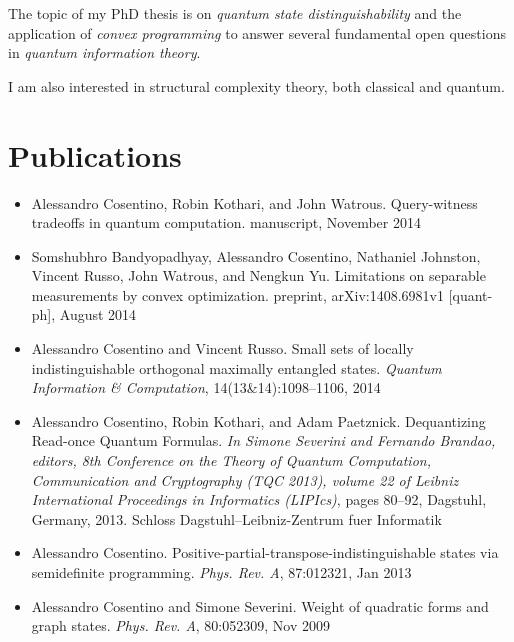 \documentclass[]{article}
\begin{document}
The topic of my PhD thesis is on \emph{quantum state distinguishability} 
and the application of 
\emph{convex programming} to answer several fundamental open questions in 
\emph{quantum information theory}.

I am also interested in structural complexity theory, both classical and 
quantum.

% 
\section{Publications}\label{publications}

\begin{itemize}
\item Alessandro Cosentino, Robin Kothari, and John Watrous. Query-witness 
tradeoffs in quantum computation. manuscript, November 2014
\item Somshubhro Bandyopadhyay, Alessandro Cosentino, Nathaniel Johnston, 
Vincent Russo, John Watrous, and Nengkun Yu. Limitations on separable 
measurements by convex optimization. preprint,
arXiv:1408.6981v1 [quant-ph], August 2014
\item Alessandro Cosentino and Vincent Russo. Small sets of locally 
indistinguishable orthogonal maximally
entangled states. \emph{Quantum Information \& Computation}, 
14(13&14):1098–1106, 2014
\item Alessandro Cosentino, Robin Kothari, and Adam Paetznick. 
Dequantizing Read-once Quantum Formulas.
\emph{In Simone Severini and Fernando Brandao, editors, 8th Conference on the 
Theory of Quantum Computation, Communication and Cryptography (TQC 2013), 
volume 22 of Leibniz International Proceedings
in Informatics (LIPIcs)}, pages 80--92, Dagstuhl, Germany, 2013. Schloss 
Dagstuhl–Leibniz-Zentrum fuer Informatik
\item Alessandro Cosentino. Positive-partial-transpose-indistinguishable states 
via semidefinite programming.
\emph{Phys. Rev. A}, 87:012321, Jan 2013
\item Alessandro Cosentino and Simone Severini. Weight of quadratic forms and 
graph states. \emph{Phys. Rev. A}, 80:052309, Nov 2009
\end{itemize}
\end{document}

